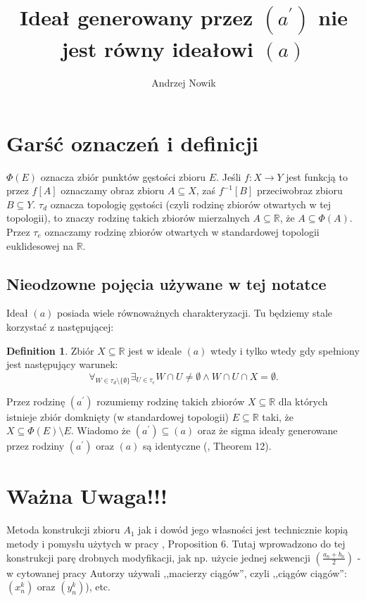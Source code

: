 \documentclass[12pt]{amsart}
\author{Andrzej Nowik}
\theoremstyle{plain}
\theoremstyle{definition}
\newtheorem{definition}[theorem]{Definition}
\theoremstyle{remark}
\newcommand{\real}{\mathbb{R}}
\newcommand{\aideal}{\mathit{(a)}}
\newcommand{\aidealprime}{\mathit{(a^\prime)}}
\begin{document}
\title{Ideał generowany przez $\aidealprime$ nie jest równy ideałowi $\aideal$}


\maketitle

\section{Garść oznaczeń i definicji}
$\Phi(E)$ oznacza zbiór punktów gęstości zbioru $E$.
Jeśli $f \colon X \to Y$ jest funkcją to przez
$f[A]$ oznaczamy obraz zbioru $A\subseteq X$, 
zaś $f^{-1}[B]$ przeciwobraz zbioru $B \subseteq Y$.
$\tau_d$ oznacza topologię gęstości
(czyli rodzinę zbiorów otwartych w tej topologii),
to znaczy rodzinę takich zbiorów mierzalnych $A\subseteq\real$,
że $A \subseteq \Phi(A)$. Przez $\tau_e$ oznaczamy rodzinę
zbiorów otwartych w standardowej topologii euklidesowej na $\real$.

\subsection{Nieodzowne pojęcia używane w tej notatce}
Ideał $\aideal$ posiada wiele równoważnych charakteryzacji.
Tu będziemy stale korzystać z następującej:
\begin{definition}
  Zbiór $X \subseteq \real$ jest w ideale $\aideal$ wtedy i tylko
  wtedy gdy spełniony jest następujący warunek:
  \[
  \forall_{W \in \tau_d\setminus\lbrace\emptyset\rbrace}
    \exists_{U \in \tau_e} W \cap U \not= \emptyset \wedge
    W \cap U \cap X = \emptyset.
  \]
\end{definition}

Przez rodzinę $\aidealprime$ rozumiemy rodzinę takich zbiorów
$X\subseteq\real$ dla których istnieje zbiór
domknięty (w standardowej topologii) $E \subseteq\real$
taki, że $X \subseteq \Phi(E) \setminus E$. Wiadomo
że $\aidealprime\subseteq\aideal$ oraz że sigma ideały
generowane przez rodziny $\aidealprime$ oraz $\aideal$
są identyczne (\cite{FG}, Theorem 12).

\section{Ważna Uwaga!!!}
Metoda konstrukcji zbioru $A_1$ jak i dowód 
jego własności jest technicznie kopią metody i pomysłu
użytych w pracy \cite{FG}, Proposition 6.
Tutaj wprowadzono do tej konstrukcji parę
drobnych modyfikacji, jak np. użycie jednej
sekwencji $(\frac{a_n + b_n}{2})$ - w
cytowanej pracy Autorzy używali ,,macierzy ciągów'',
czyli ,,ciągów ciągów'': $(x_n^k)$ oraz $(y_n^k)$),
etc.
\end{document}
